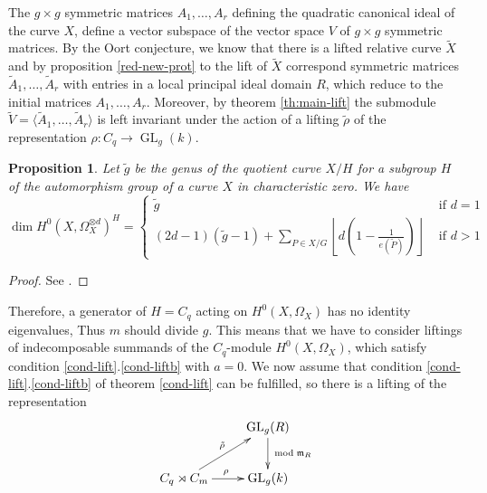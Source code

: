 \documentclass[11pt,letterpaper]{amsart}
\newtheorem{proposition}[theorem]{Proposition}
\theoremstyle{definition}
\DeclareMathOperator\Aut{Aut}
\DeclareMathOperator\Gl {GL}
\newcommand{\lf}{\left\lfloor}
\newcommand{\rf}{\right\rfloor}
\renewcommand{\mod}{\bmod}
\begin{document}
The $g\times g$ symmetric matrices $A_1,\ldots,A_r$ defining the quadratic canonical ideal of the curve $X$, define a vector subspace of the vector space $V$ of $g\times g$ symmetric matrices. By the Oort conjecture, we know that there is a lifted relative curve $\tilde{X}$ and 
by proposition \ref{red-new-prot} to the lift of $\tilde{X}$ correspond symmetric matrices $\tilde{A}_1,\ldots,\tilde{A}_r$ with entries in a local principal ideal domain $R$, which reduce to the initial matrices $A_1,\ldots,A_r$.
Moreover, by theorem \ref{th:main-lift} the submodule  $\tilde{V}=\langle \tilde{A}_1,\ldots,\tilde{A}_r \rangle$ is left invariant under the action of a lifting $\tilde{\rho}$ of the representation $\rho:C_q \rightarrow \Gl _g(k)$. 


\begin{proposition}
\label{prop:no-eigenvalues}
Let $\tilde{g}$ be the genus of the quotient curve $X/H$ for a subgroup $H$ of the automorphism group of a curve $X$ in characteristic zero. We have
\[
\dim H^0(X,\Omega_X^{\otimes d})^{H}=
\begin{cases} \displaystyle
\tilde{g} & \text{ if } d=1 \\
(2d-1)(\tilde{g}-1) + \sum_{P \in X/G} 
\lf d  
\left(
1 - \frac{1}{e(\tilde{P})}
\right) \rf & \text{ if } d> 1
\end{cases}
\]
\end{proposition}
\begin{proof}
See \cite[eq. 2.2.3,2.2.4 p. 254]{Farkas-Kra}.
\end{proof}
Therefore, a generator of $H=C_q$ acting on $H^0(X,\Omega_X)$ has no identity eigenvalues, 
  Thus $m$ should divide $g$. This means that we have to consider liftings of indecomposable summands of  the $C_q$-module $H^0(X,\Omega_X)$, which satisfy condition \ref{cond-lift}.\ref{cond-liftb} with $a=0$.
We now assume that condition \ref{cond-lift}.\ref{cond-liftb} of theorem \ref{cond-lift} can be fulfilled, so there is a lifting
of the representation
\[
\xymatrix{
  & \Gl _g(R) \ar[d]^{\mod \mathfrak{m}_R}\\
  C_q \rtimes C_m \ar[r]^{\rho} 
\ar[ru]^{\tilde{\rho}}
  & \Gl _g(k)
}
\]
\end{document}
